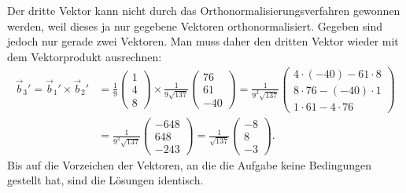 \begin{loesung}
\[\]
Der dritte Vektor kann nicht durch das Orthonormalisierungsverfahren
gewonnen werden, weil dieses ja nur gegebene Vektoren orthonormalisiert.
Gegeben sind jedoch nur gerade zwei Vektoren. Man muss daher den dritten
Vektor wieder mit dem Vektorprodukt ausrechnen:
\begin{align*}
\vec b_3'
=
\vec b_1'\times\vec b_2'
&=
\frac19
\begin{pmatrix}
1\\4\\8
\end{pmatrix}
\times
\frac1{9\sqrt{137}}\begin{pmatrix}
76\\
61\\
-40
\end{pmatrix}
=
\frac1{9^2\sqrt{137}}
\begin{pmatrix}
4\cdot (-40)-61\cdot 8\\
8\cdot 76-(-40)\cdot 1\\
1\cdot 61-4\cdot 76
\end{pmatrix}
\\
&=
\frac1{9^2\sqrt{137}}
\begin{pmatrix}
-648\\
648\\
-243
\end{pmatrix}
=
\frac1{\sqrt{137}}
\begin{pmatrix}
-8\\
8\\
-3
\end{pmatrix}.
\end{align*}
Bis auf die Vorzeichen der Vektoren, an die die Aufgabe keine Bedingungen
gestellt hat, sind die Lösungen identisch.
\end{loesung}

